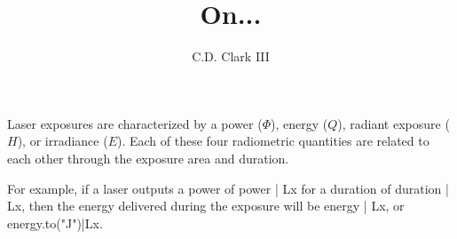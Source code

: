 \documentclass[]{article}
\author{C.D. Clark III}
\title{On...}
\begin{document}
\maketitle



Laser exposures are characterized by a power ($\Phi$), energy ($Q$), radiant exposure ($H$),
or irradiance ($E$). Each of these four radiometric quantities are related to each other
through the exposure area and duration.


For example, if a laser outputs a power of {{power | Lx}} for a
duration of {{duration | Lx}}, then the energy delivered during the
exposure will be {{energy | Lx}}, or {{energy.to("J")|Lx}}.
\end{document}

